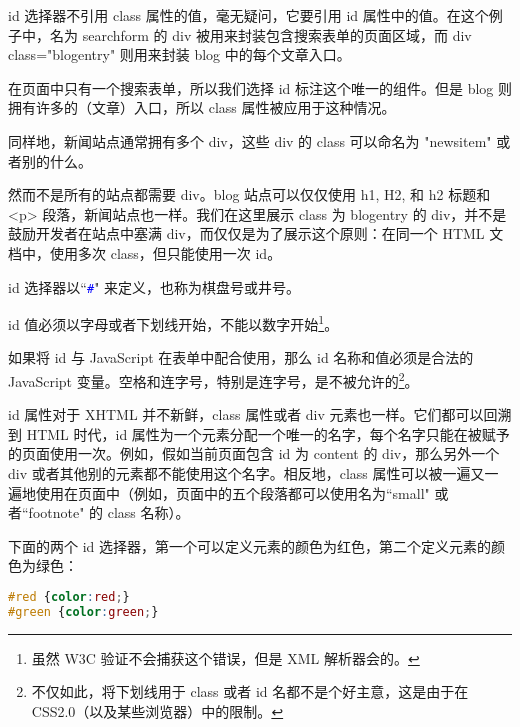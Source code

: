id 选择器不引用 class 属性的值，毫无疑问，它要引用 id 属性中的值。在这个例子中，名为 searchform 的 div 被用来封装包含搜索表单的页面区域，而 div class="blogentry" 则用来封装 blog 中的每个文章入口。

在页面中只有一个搜索表单，所以我们选择 id 标注这个唯一的组件。但是 blog 则拥有许多的（文章）入口，所以 class 属性被应用于这种情况。

同样地，新闻站点通常拥有多个 div，这些 div 的 class 可以命名为 "newsitem" 或者别的什么。

然而不是所有的站点都需要 div。blog 站点可以仅仅使用 h1, H2, 和 h2 标题和 <p> 段落，新闻站点也一样。我们在这里展示 class 为 blogentry 的 div，并不是鼓励开发者在站点中塞满 div，而仅仅是为了展示这个原则：在同一个 HTML 文档中，使用多次 class，但只能使用一次 id。

\begin{compactitem}
\item id 选择器以``\textcolor{Blue}{\texttt{\#}}" 来定义，也称为棋盘号或井号。

\item id 值必须以字母或者下划线开始，不能以数字开始\footnote{虽然 W3C 验证不会捕获这个错误，但是 XML 解析器会的。}。

\item 如果将 id 与 JavaScript 在表单中配合使用，那么 id 名称和值必须是合法的 JavaScript 变量。空格和连字号，特别是连字号，是不被允许的\footnote{不仅如此，将下划线用于 class 或者 id 名都不是个好主意，这是由于在 CSS2.0（以及某些浏览器）中的限制。}。

\end{compactitem}



id 属性对于 XHTML 并不新鲜，class 属性或者 div 元素也一样。它们都可以回溯到 HTML 时代，id 属性为一个元素分配一个唯一的名字，每个名字只能在被赋予的页面使用一次。例如，假如当前页面包含 id 为 content 的 div，那么另外一个 div 或者其他别的元素都不能使用这个名字。相反地，class 属性可以被一遍又一遍地使用在页面中（例如，页面中的五个段落都可以使用名为``small" 或者``footnote" 的 class 名称）。







下面的两个 id 选择器，第一个可以定义元素的颜色为红色，第二个定义元素的颜色为绿色：

\begin{lstlisting}[language=CSS]
#red {color:red;}
#green {color:green;}
\end{lstlisting}

